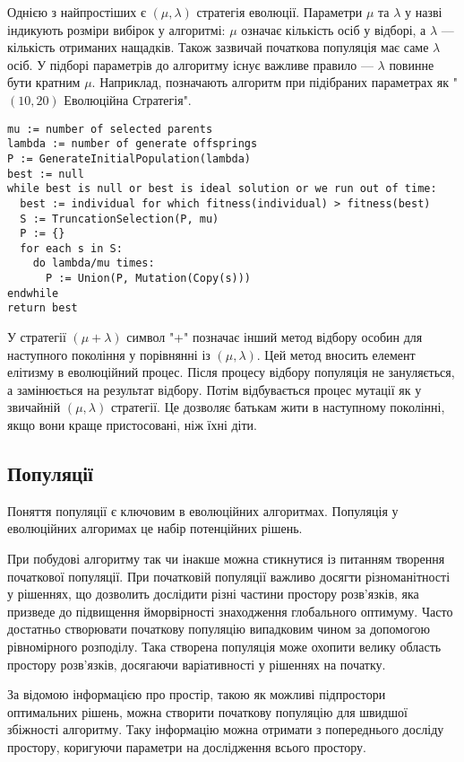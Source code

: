 Однією з найпростіших є
$\left( \mu, \lambda \right)$ стратегія еволюції. Параметри $\mu$ та 
$\lambda$ у назві індикують розміри вибірок у алгоритмі: $\mu$ означає кількість
осіб у відборі, а $\lambda$ --- кількість отриманих нащадків.
Також зазвичай початкова популяція має саме $\lambda$ осіб.
У підборі параметрів до алгоритму існує важливе правило --- $\lambda$ 
повинне бути кратним $\mu$. Наприклад, позначають
алгоритм при підібраних параметрах як "$(10, 20)$ Еволюційна Стратегія".

\begin{lstlisting}[caption={$(\mu,\lambda)$ Еволюційна Стратегія}]
mu := number of selected parents
lambda := number of generate offsprings
P := GenerateInitialPopulation(lambda)
best := null
while best is null or best is ideal solution or we run out of time:
  best := individual for which fitness(individual) > fitness(best)
  S := TruncationSelection(P, mu)
  P := {}
  for each s in S:
    do lambda/mu times:
      P := Union(P, Mutation(Copy(s)))
endwhile
return best
\end{lstlisting}


У стратегії $\left( \mu + \lambda \right)$ символ "+" позначає
інший метод відбору особин для наступного покоління у порівнянні із
$\left( \mu, \lambda \right) $.
Цей метод вносить елемент елітизму в еволюційний процес.
Після процесу відбору популяція не зануляється, а замінюється на
результат відбору.
Потім відбувається процес мутації як у звичайній
$\left( \mu, \lambda \right)$ стратегії.
Це дозволяє батькам жити в наступному поколінні, 
якщо вони краще пристосовані, ніж їхні діти.


\subsection{Популяції}
Поняття популяції є ключовим в еволюційних алгоритмах.
Популяція у еволюційних алгоримах це набір потенційних рішень.

При побудові алгоритму так чи інакше можна стикнутися із питанням творення початкової
популяції.
При початковій популяції важливо досягти різноманітності у рішеннях,
що дозволить дослідити різні частини простору розв'язків, яка
призведе до підвищення йморвірності знаходження глобального оптимуму.
Часто достатньо створювати початкову популяцію випадковим чином 
за допомогою рівномірного розподілу. Така створена популяція може охопити 
велику область простору розв'язків, досягаючи варіативності у рішеннях на початку.

За відомою інформацією про простір, такою як можливі підпростори оптимальних рішень,
можна створити початкову популяцію для швидшої збіжності алгоритму. Таку інформацію
можна отримати з попереднього досліду простору,
коригуючи параметри на дослідження всього простору.

